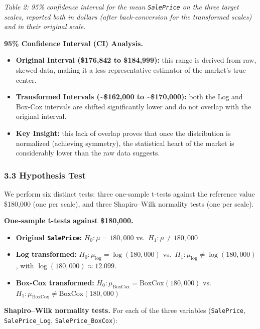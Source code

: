 \emph{Table 2: 95\% confidence interval for the mean \texttt{SalePrice}
on the three target scales, reported both in dollars (after
back-conversion for the transformed scales) and in their original
scale.}

\textbf{95\% Confidence Interval (CI) Analysis.}

\begin{itemize}
\tightlist
\item
  \textbf{Original Interval (\$176,842 to \$184,999):} this range is
  derived from raw, skewed data, making it a less representative
  estimator of the market's true center.
\item
  \textbf{Transformed Intervals (\textasciitilde\$162,000 to
  \textasciitilde\$170,000):} both the Log and Box-Cox intervals are
  shifted significantly lower and do not overlap with the original
  interval.
\item
  \textbf{Key Insight:} this lack of overlap proves that once the
  distribution is normalized (achieving symmetry), the statistical heart
  of the market is considerably lower than the raw data suggests.
\end{itemize}

\subsubsection{3.3 Hypothesis Test}\label{hypothesis-test}

We perform six distinct tests: three one-sample t-tests against the
reference value \$180,000 (one per scale), and three Shapiro--Wilk
normality tests (one per scale).

\textbf{One-sample t-tests against \$180,000.}

\begin{itemize}
\tightlist
\item
  \textbf{Original \texttt{SalePrice}:} \(H_0: \mu = 180{,}000\)
  vs.~\(H_1: \mu \neq 180{,}000\)
\item
  \textbf{Log transformed:} \(H_0: \mu_{\log} = \log(180{,}000)\)
  vs.~\(H_1: \mu_{\log} \neq \log(180{,}000)\), with
  \(\log(180{,}000) \approx 12.099\).
\item
  \textbf{Box-Cox transformed:}
  \(H_0: \mu_{\text{BoxCox}} = \text{BoxCox}(180{,}000)\)
  vs.~\(H_1: \mu_{\text{BoxCox}} \neq \text{BoxCox}(180{,}000)\)
\end{itemize}

\textbf{Shapiro--Wilk normality tests.} For each of the three variables
(\texttt{SalePrice}, \texttt{SalePrice\_Log},
\texttt{SalePrice\_BoxCox}):

